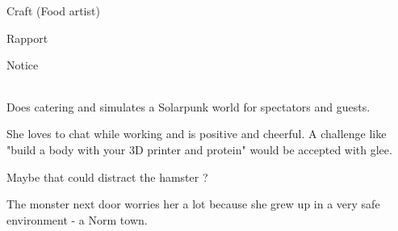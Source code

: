 \begin{npcBox}[title=Cherie]

    \begin{aspects}
    \item {}
    \item {}    
    \item {}    
    \end{aspects}
    
    \begin{skills}
    \item {} Craft (Food artist)
    \item {} Rapport
    \item {} Notice    
    \end{skills}
    
    \begin{stunts}
    \item {}
    \end{stunts}
    
    \begin{stressSection}
    \end{stressSection}
    \begin{tabularx}{\textwidth}{ XX }
    \end{tabularx}
    
    \begin{consequences}
    \item {}
    \item {}
    \item {}
    \end{consequences}
    
    \begin{npcDescription}
    Does catering and simulates a Solarpunk world for spectators and guests.
    
    She loves to chat while working and is positive and cheerful. A challenge like "build a body with your 3D printer and protein" would be accepted with glee.

    Maybe that could distract the hamster ?

    The monster next door worries her a lot because she grew up in a very safe environment - a Norm town.

    \end{npcDescription}
    
\end{npcBox}




